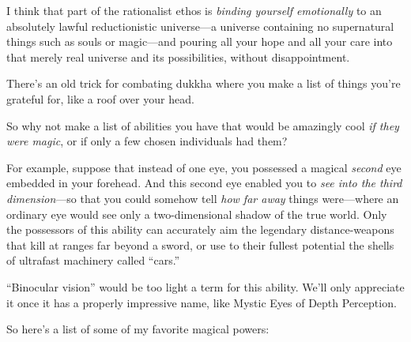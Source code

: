 \myendsectiontext


\bigskip


{
 I think that part of the rationalist ethos is \textit{binding
yourself emotionally} to an absolutely lawful reductionistic
universe---a universe containing no supernatural things such as souls
or magic---and pouring all your hope and all your care into that merely
real universe and its possibilities, without disappointment. }

{
 There's an old trick for combating dukkha where
you make a list of things you're grateful for, like a
roof over your head.}

{
 So why not make a list of abilities you have that would be
amazingly cool \textit{if they were magic}, or if only a few chosen
individuals had them?}

{
 For example, suppose that instead of one eye, you possessed a
magical \textit{second} eye embedded in your forehead. And this second
eye enabled you to \textit{see into the third dimension}{}---so that
you could somehow tell \textit{how far away} things were---where an
ordinary eye would see only a two-dimensional shadow of the true world.
Only the possessors of this ability can accurately aim the legendary
distance-weapons that kill at ranges far beyond a sword, or use to
their fullest potential the shells of ultrafast machinery called
``cars.''}

{
 ``Binocular vision'' would be
too light a term for this ability. We'll only
appreciate it once it has a properly impressive name, like Mystic Eyes
of Depth Perception.}

{
 So here's a list of some of my favorite magical
powers:}

